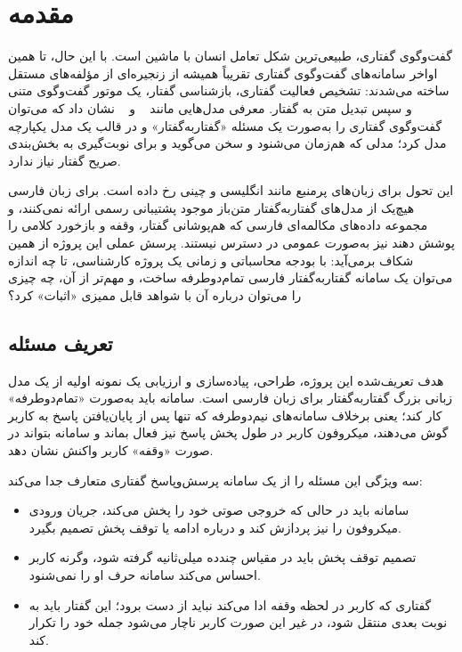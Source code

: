 
\chapter{مقدمه}
\label{ch:intro}

گفت‌وگوی گفتاری، طبیعی‌ترین شکل تعامل انسان با ماشین است. با این حال، تا همین
اواخر سامانه‌های گفت‌وگوی گفتاری تقریباً همیشه از زنجیره‌ای از مؤلفه‌های مستقل
ساخته می‌شدند: تشخیص فعالیت گفتاری، بازشناسی گفتار، یک موتور گفت‌وگوی متنی و
سپس تبدیل متن به گفتار. معرفی مدل‌هایی مانند ~\cite{defossez2024moshi}
و ~\cite{wang2025freezeomni} نشان داد که می‌توان گفت‌وگوی گفتاری
را به‌صورت یک مسئله «گفتار‌به‌گفتار» و در قالب یک مدل یکپارچه مدل کرد؛ مدلی که
هم‌زمان می‌شنود و سخن می‌گوید و برای نوبت‌گیری به بخش‌بندی صریح گفتار نیاز
ندارد.

این تحول برای زبان‌های پرمنبع مانند انگلیسی و چینی رخ داده است. برای زبان فارسی
هیچ‌یک از مدل‌های گفتار‌به‌گفتار متن‌باز موجود پشتیبانی رسمی ارائه نمی‌کنند، و
مجموعه داده‌های مکالمه‌ای فارسی که هم‌پوشانی گفتار، وقفه و بازخورد کلامی را
پوشش دهند نیز به‌صورت عمومی در دسترس نیستند. پرسش عملی این پروژه از همین شکاف
برمی‌آید: با بودجه محاسباتی و زمانی یک پروژه کارشناسی، تا چه اندازه می‌توان یک
سامانه گفتار‌به‌گفتار فارسی تمام‌دوطرفه ساخت، و مهم‌تر از آن، چه چیزی را
می‌توان درباره آن با شواهد قابل ممیزی «اثبات» کرد؟

\section{تعریف مسئله}
\label{sec:problem}

هدف تعریف‌شده این پروژه، طراحی، پیاده‌سازی و ارزیابی یک نمونه اولیه از یک مدل
زبانی بزرگ گفتار‌به‌گفتار برای زبان فارسی است. سامانه باید به‌صورت
«تمام‌دوطرفه» کار کند؛ یعنی برخلاف سامانه‌های
نیم‌دوطرفه که تنها پس از پایان‌یافتن پاسخ به کاربر گوش می‌دهند، میکروفون کاربر
در طول پخش پاسخ نیز فعال بماند و سامانه بتواند در صورت
«وقفه» کاربر واکنش نشان دهد.

سه ویژگی این مسئله را از یک سامانه پرسش‌و‌پاسخ گفتاری متعارف جدا می‌کند:

\begin{itemize}
\item {} سامانه باید در حالی که خروجی صوتی خود را
      پخش می‌کند، جریان ورودی میکروفون را نیز پردازش کند و درباره ادامه یا
      توقف پخش تصمیم بگیرد.
\item {} تصمیم توقف پخش باید در مقیاس چند‌ده
      میلی‌ثانیه گرفته شود، وگرنه کاربر احساس می‌کند سامانه حرف او را
      نمی‌شنود.
\item {} گفتاری که کاربر در لحظه وقفه ادا می‌کند
      نباید از دست برود؛ این گفتار باید به نوبت بعدی منتقل شود، در غیر این صورت
      کاربر ناچار می‌شود جمله خود را تکرار کند.
\end{itemize}

